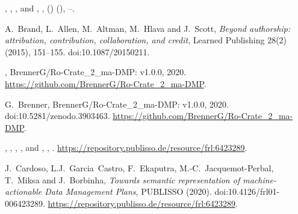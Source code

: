 \documentclass[ds,v1.1.2,openaccess]{iosart2x}%
\begin{document}
\begin{thebibliography}{}
%
\begin{barticle}
,
,
,
 and
,
,
()
(),
--.
\end{barticle}
%
\OrigBibText
A.~Brand,
L.~Allen,
M.~Altman,
M.~Hlava and
J.~Scott,
\textit{Beyond authorship: attribution, contribution, collaboration, and
credit},
Learned Publishing
28(2)
(2015),
151--155.
doi:10.1087/20150211.
\endOrigBibText
{}
\endbibitem

%
\begin{botherref}
,
BrennerG/Ro-Crate\_2\_ma-DMP: v1.0.0,
2020.
\url{https://github.com/BrennerG/Ro-Crate\_2\_ma-DMP}.
\end{botherref}
%
\OrigBibText
G.~Brenner,
BrennerG/Ro-Crate\_2\_ma-DMP: v1.0.0,
2020.
doi:10.5281/zenodo.3903463.
\url{https://github.com/BrennerG/Ro-Crate_2_ma-DMP}.
\endOrigBibText
{}
\endbibitem

%
\begin{bbook}
,
,
,
,
 and
,
,
.
\url{https://repository.publisso.de/resource/frl:6423289}.
\end{bbook}
%
\OrigBibText
J.~Cardoso,
L.J.~Garcia~Castro,
F.~Ekaputra,
M.-C.~Jacquemot-Perbal,
T.~Miksa and
J.~Borbinha,
\textit{Towards semantic representation of machine-actionable Data Management
Plans},
PUBLISSO
(2020).
doi:10.4126/frl01-006423289.
\url{https://repository.publisso.de/resource/frl:6423289}.
\endOrigBibText
{}
\endbibitem


\end{thebibliography}
\end{document}
